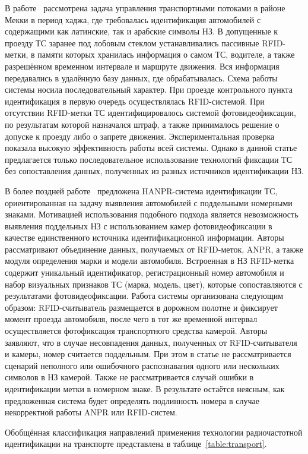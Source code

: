\documentclass[12pt]{article}
\theoremstyle{definition}
\begin{document}
В работе~\cite{mohandes2016intelligent} рассмотрена задача управления транспортными потоками в районе Мекки в период хаджа, где требовалась идентификация автомобилей с содержащими как латинские, так и арабские символы НЗ. В допущенные к проезду ТС заранее под лобовым стеклом устанавливались пассивные RFID-метки, в памяти которых хранилась информация о самом ТС, водителе, а также разрешённом временном интервале и маршруте движения. Вся информация передавались в удалённую базу данных, где обрабатывалась. Схема работы системы носила последовательный характер. При проезде контрольного пункта идентификация в первую очередь осуществлялась RFID-системой. При отсутствии RFID-метки ТС идентифицировалось системой фотовидеофиксации, по результатам которой назначался штраф, а также принималось решение о допуске к проезду либо о запрете движения. Экспериментальная проверка показала высокую эффективность работы всей системы. Однако в данной статье предлагается только последовательное использование технологий фиксации ТС без сопоставления данных, полученных из разных источников идентификации НЗ.

В более поздней работе~\cite{fiorita2024combining} предложена HANPR-система идентификации ТС, ориентированная на задачу выявления автомобилей с поддельными номерными знаками. Мотивацией использования подобного подхода является невозможность выявления поддельных НЗ с использованием камер фотовидеофиксации в качестве единственного источника идентификационной информации. Авторы рассматривают объединение данных, получаемых от RFID-меток, ANPR, а также модуля определения марки и модели автомобиля. Встроенная в НЗ RFID-метка содержит уникальный идентификатор, регистрационный номер автомобиля и набор визуальных признаков ТС (марка, модель, цвет), которые сопоставляются с результатами фотовидеофиксации. Работа системы организована следующим образом: RFID-считыватель размещается в дорожном полотне и фиксирует момент проезда автомобиля, после чего в тот же временной интервал осуществляется фотофиксация транспортного средства камерой. Авторы заявляют, что в случае несовпадения данных, полученных от RFID-считывателя и камеры, номер считается поддельным. При этом в статье не рассматривается сценарий неполного или ошибочного распознавания одного или нескольких символов в НЗ камерой. Также не рассматривается случай ошибки в идентификации метки в номерном знаке. В результате остаётся неясным, как предложенная система будет определять подлинность номера в случае некорректной работы ANPR или RFID-систем.

Обобщённая классификация направлений применения технологии радиочастотной идентификации на транспорте представлена в таблице~\ref{table:transport}.
\end{document}
